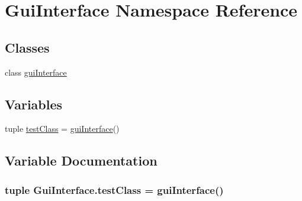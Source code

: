 \hypertarget{namespace_gui_interface}{\section{Gui\-Interface Namespace Reference}
\label{namespace_gui_interface}
}
\subsection*{Classes}
\begin{DoxyCompactItemize}
\item 
class \hyperlink{class_gui_interface_1_1gui_interface}{gui\-Interface}
\end{DoxyCompactItemize}
\subsection*{Variables}
\begin{DoxyCompactItemize}
\item 
tuple \hyperlink{namespace_gui_interface_aad54ad254e54f02b48ef15be00d873db}{test\-Class} = \hyperlink{class_gui_interface_1_1gui_interface}{gui\-Interface}()
\end{DoxyCompactItemize}


\subsection{Variable Documentation}
\hypertarget{namespace_gui_interface_aad54ad254e54f02b48ef15be00d873db}{
\subsubsection[{test\-Class}]{\setlength{\rightskip}{0pt plus 5cm}tuple {\bf Gui\-Interface.\-test\-Class} = {\bf gui\-Interface}()}}\label{namespace_gui_interface_aad54ad254e54f02b48ef15be00d873db}
